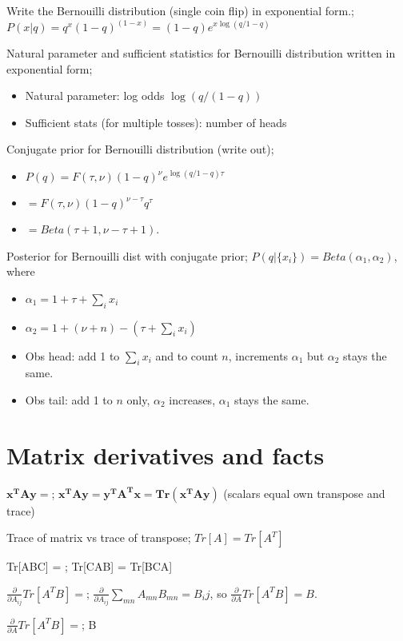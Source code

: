 \documentclass{article}
\begin{document}
Write the Bernouilli distribution (single coin flip) in exponential form.; $P(x|q) = q^x(1-q)^{(1-x)} = (1-q)e^{x\log(q/1-q)}$

Natural parameter and sufficient statistics for Bernouilli distribution written in exponential form; \begin{itemize} \item Natural parameter: log odds $\log (q/(1-q))$ \item Sufficient stats (for multiple tosses): number of heads \end{itemize}

Conjugate prior for Bernouilli distribution (write out); \begin{itemize} \item $P(q)=F(\tau, \nu)(1-q)^{\nu}e^{\log(q/1-q)\tau}$ \item $=F(\tau, \nu)(1-q)^{\nu-\tau}q^{\tau}$ \item $= Beta(\tau+1, \nu-\tau+1)$.  \end{itemize}

Posterior for Bernouilli dist with conjugate prior; $P(q|\{x_i\}) = Beta(\alpha_1, \alpha_2)$, where \begin{itemize} \item $\alpha_1 = 1+\tau+\sum_i x_i$ \item $\alpha_2 = 1+(\nu+n) - (\tau+\sum_i x_i)$ \item Obs head: add 1 to $\sum_i x_i$ and to count $n$, increments $\alpha_1$ but $\alpha_2$ stays the same.  \item Obs tail: add 1 to $n$ only, $\alpha_2$ increases, $\alpha_1$ stays the same.  \end{itemize}

\section{Matrix derivatives and facts}

$\mathbf{x^TAy}=$; $\mathbf{x^TAy}=\mathbf{y^TA^Tx=Tr(x^TAy)}$ (scalars equal own transpose and trace)

Trace of matrix vs trace of transpose; $Tr[A] = Tr[A^T]$

Tr[ABC] = ; Tr[CAB] = Tr[BCA]

$\frac{\partial}{\partial A_{ij}}Tr[A^TB] =$; $\frac{\partial}{\partial A_{ij}}\sum_{mn}A_{mn}B_{mn} = B_ij$, so $\frac{\partial}{\partial A}Tr[A^TB] = B$.

$\frac{\partial}{\partial A}Tr[A^TB] = $; B
\end{document}
